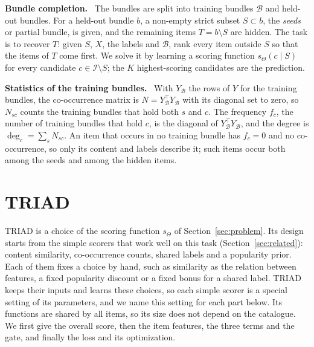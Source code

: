 \documentclass[runningheads]{llncs}
\newcommand{\B}{\mathcal{B}}
\renewcommand{\paragraph}[1]{\smallskip\noindent\textbf{#1}\ }
\begin{document}
\paragraph{Bundle completion.} The bundles are split into training bundles $\B$ and held-out bundles. For a held-out
bundle $b$, a non-empty strict subset $S\subset b$, the \emph{seeds} or partial bundle, is given, and the remaining
items $T=b\setminus S$ are hidden. The task is to recover $T$: given $S$, $X$, the labels and $\B$, rank every item
outside $S$ so that the items of $T$ come first. We solve it by learning a scoring function $s_\Theta(c\mid S)$ for
every candidate $c\in\mathcal{I}\setminus S$; the $K$ highest-scoring candidates are the prediction.

\paragraph{Statistics of the training bundles.} With $Y_{\B}$ the rows of $Y$ for the training bundles, the
co-occurrence matrix is $N=Y_{\B}^\top Y_{\B}$ with its diagonal set to zero, so $N_{sc}$ counts the training bundles
that hold both $s$ and $c$. The frequency $f_c$, the number of training bundles that hold $c$, is the diagonal of
$Y_{\B}^\top Y_{\B}$, and the degree is $\deg_c=\sum_s N_{sc}$. An item that occurs in no training bundle has $f_c=0$ and no co-occurrence, so only its content and labels describe
it; such items occur both among the seeds and among the hidden items.

\section{TRIAD}
\label{sec:method}

TRIAD is a choice of the scoring function $s_\Theta$ of Section~\ref{sec:problem}. Its design starts from the simple
scorers that work well on this task (Section~\ref{sec:related}): content similarity, co-occurrence counts, shared
labels and a popularity prior. Each of them fixes a choice by hand, such as similarity as the relation between
features, a fixed popularity discount or a fixed bonus for a shared label. TRIAD keeps their inputs and learns these
choices, so each simple scorer is a special setting of its parameters, and we name this setting for each part below.
Its functions are shared by all items, so its size does not depend on the catalogue. We first give the overall score,
then the item features, the three terms and the gate, and finally the loss and its optimization.
\end{document}

